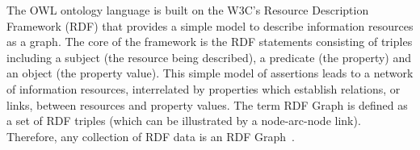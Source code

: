 
The OWL ontology language is built on the W3C's Resource Description Framework (RDF) that provides a simple model to describe information resources as a graph. The core of the framework is the RDF statements consisting of triples including a subject (the resource being described), a predicate (the property) and an object (the property value). This simple model of assertions leads to a network of information resources, interrelated by properties which establish relations, or links, between resources and property values. The term RDF Graph is defined as a set of RDF triples (which can be illustrated by a node-arc-node link). Therefore, any collection of RDF data is an RDF Graph~\cite{GraphModelRDF}.

